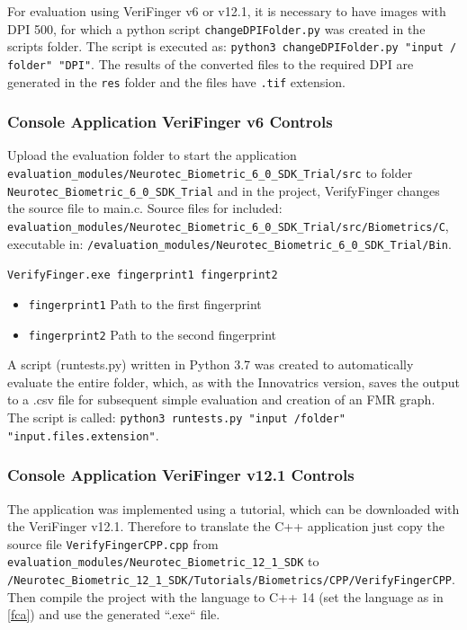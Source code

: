 For evaluation using VeriFinger v6 or v12.1, it is necessary to have images with DPI 500, for which a python script \texttt{changeDPIFolder.py} was created in the scripts folder. The script is executed as: \texttt{python3 changeDPIFolder.py "input / folder" "DPI"}. The results of the converted files to the required DPI are generated in the \texttt{res} folder and the files have \texttt{.tif} extension.

\subsubsection{Console Application VeriFinger v6 Controls}
\label{v6_console}
Upload the evaluation folder to start the application \texttt{evaluation\_modules/Neurotec\_Biom\-etric\_6\_0\_SDK\_Tri\-al/src} to folder \texttt{Neurotec\_Biometric\_6\_0\_SDK\_Trial} and in the pro\-ject, VerifyFinger changes the source file to main.c. Source files for included: \texttt{evaluation\_m\-odules/Neuro\-tec\_Biometric\_6\_0\_SDK\_Trial/src/Biometrics/C}, executable in: \texttt{/eval\-uation\_module\-s/Neurotec\_Biometric\_6\_0\_SDK\_Trial/Bin}.

\texttt{VerifyFinger.exe fingerprint1 fingerprint2}
\begin{itemize}
    \item \texttt{fingerprint1} Path to the first fingerprint
    \item \texttt{fingerprint2} Path to the second fingerprint
\end{itemize}

A script (runtests.py) written in Python 3.7 was created to automatically evaluate the entire folder, which, as with the Innovatrics version, saves the output to a .csv file for subsequent simple evaluation and creation of an FMR graph. The script is called: \texttt{python3 runtests.py "input /folder" "input.files.extension"}.

\subsubsection{Console Application VeriFinger v12.1 Controls}
The application was implemented using a tutorial, which can be downloaded with the VeriFinger v12.1. Therefore to translate the C++ application just copy the source file \texttt{VerifyFingerCPP.cpp} from \texttt{evaluation\_modules/Neurotec\_Biometric\_12\_1\_SDK} to \texttt{/N\-eurotec\_Biometric\_12\_1\_SDK/Tu\-torials/Biometrics/CPP/VerifyFingerCPP}. Then compile the project with the language to C++ 14 (set the language as in \ref{fca}) and use the generated ``.exe`` file.

